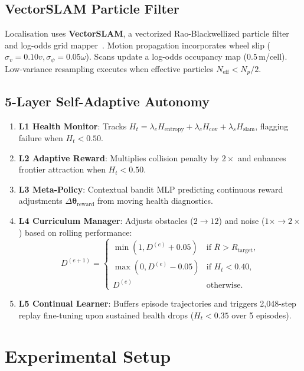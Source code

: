 \documentclass[conference]{IEEEtran}
\begin{document}
\subsection{VectorSLAM Particle Filter}
Localisation uses \textbf{VectorSLAM}, a vectorized Rao-Blackwellized particle filter~\cite{grisetti2007} and log-odds grid mapper~\cite{elfes1989}. Motion propagation incorporates wheel slip ($\sigma_v = 0.10v, \sigma_\psi = 0.05\omega$). Scans update a log-odds occupancy map ($0.5$\,m/cell). Low-variance resampling executes when effective particles $N_{\text{eff}} < N_p/2$.

\subsection{5-Layer Self-Adaptive Autonomy}
\begin{enumerate}
    \item \textbf{L1 Health Monitor}: Tracks $H_t = \lambda_e H_{\text{entropy}} + \lambda_c H_{\text{cov}} + \lambda_s H_{\text{slam}}$, flagging failure when $H_t < 0.50$.
    \item \textbf{L2 Adaptive Reward}: Multiplies collision penalty by $2\times$ and enhances frontier attraction when $H_t < 0.50$.
    \item \textbf{L3 Meta-Policy}: Contextual bandit MLP predicting continuous reward adjustments $\Delta\boldsymbol{\theta}_{\text{reward}}$ from moving health diagnostics.
    \item \textbf{L4 Curriculum Manager}: Adjusts obstacles ($2 \to 12$) and noise ($1\times \to 2\times$) based on rolling performance:
    \begin{equation}
    \label{eq:curriculum}
    D^{(e+1)} = \begin{cases}
    \min(1, D^{(e)}\!+\!0.05) & \text{if } \bar{R} > R_{\text{target}}, \\
    \max(0, D^{(e)}\!-\!0.05) & \text{if } H_t < 0.40, \\
    D^{(e)} & \text{otherwise}.
    \end{cases}
    \end{equation}
    \item \textbf{L5 Continual Learner}: Buffers episode trajectories and triggers 2{,}048-step replay fine-tuning upon sustained health drops ($H_t < 0.35$ over 5 episodes).
\end{enumerate}

\section{Experimental Setup}
\end{document}
